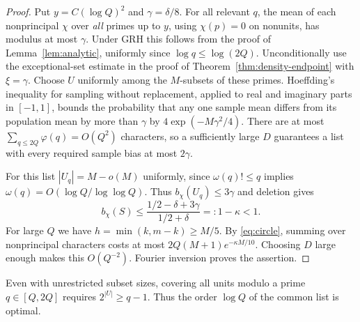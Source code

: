 \documentclass[11pt]{article}
\begin{document}
\begin{proof}
Put $y=C(\log Q)^2$ and $\gamma=\delta/8$.
For all relevant $q$, the mean of each nonprincipal $\chi$ over
\emph{all} primes up to $y$, using $\chi(p)=0$ on nonunits, has modulus
at most $\gamma$. Under GRH this follows from the proof of
Lemma~\ref{lem:analytic}, uniformly since $\log q\le\log(2Q)$.
Unconditionally use the exceptional-set estimate in the proof of
Theorem~\ref{thm:density-endpoint} with $\xi=\gamma$.
Choose $U$ uniformly among the $M$-subsets of these primes. Hoeffding's
inequality \cite{hoeffding} for sampling without replacement, applied to real and
imaginary parts in $[-1,1]$, bounds the probability that any one
sample mean differs from its population mean by more than $\gamma$ by
$4\exp(-M\gamma^2/4)$. There are at most $\sum_{q\le 2Q}\varphi(q)
=O(Q^2)$ characters, so a sufficiently large $D$ guarantees a list
with every required sample bias at most $2\gamma$.

For this list $|U_q|=M-o(M)$ uniformly, since $\omega(q)!\le q$
implies $\omega(q)=O(\log Q/\log\log Q)$. Thus
$b_\chi(U_q)\le3\gamma$ and deletion gives
\[
 b_\chi(S)\le\frac{1/2-\delta+3\gamma}{1/2+\delta}
 =:1-\kappa<1 .
\]
For large $Q$ we have $h=\min(k,m-k)\ge M/5$.
By \eqref{eq:circle}, summing over nonprincipal characters costs at most
$2Q(M+1)e^{-\kappa M/10}$. Choosing $D$ large enough makes this
$O(Q^{-2})$. Fourier inversion proves the assertion.
\end{proof}
Even with unrestricted subset sizes, covering all units modulo a prime
$q\in[Q,2Q]$ requires $2^{|U|}\ge q-1$. Thus the order $\log Q$
of the common list is optimal.
\end{document}
